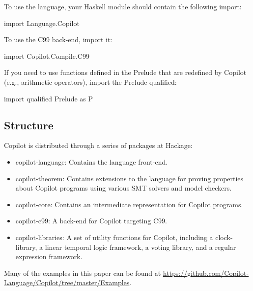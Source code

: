 \noindent To use the language, your Haskell module should contain the following import:
%
\begin{code}
import Language.Copilot
\end{code}
%
To use the C99 back-end, import it:
%
\begin{code}
import Copilot.Compile.C99
\end{code}
%
If you need to use functions defined in the Prelude that are redefined by
Copilot (e.g., arithmetic operators), import the Prelude qualified:
%
\begin{code}
import qualified Prelude as P
\end{code}

\subsection{Structure} \label{structure}

\noindent Copilot is distributed through a series of packages at Hackage:

\begin{itemize}
\item copilot-language: Contains the language front-end.
\item copilot-theorem: Contains extensions to the language for proving
properties about Copilot programs using various SMT solvers and model checkers.
\item copilot-core: Contains an intermediate representation for Copilot programs.
\item copilot-c99: A back-end for Copilot targeting C99.
\item copilot-libraries: A set of utility functions for Copilot, including a
clock-library, a linear temporal logic framework, a voting library, and a regular
expression framework.
\end{itemize}

Many of the examples in this paper can be found at
\url{https://github.com/Copilot-Language/Copilot/tree/master/Examples}.

